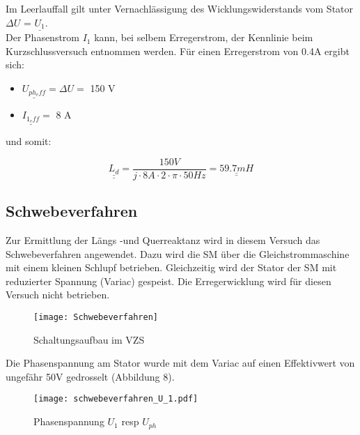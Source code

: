 \begin{flushleft}
\vspace{0.5cm}


Im Leerlauffall gilt unter Vernachlässigung des Wicklungswiderstands vom Stator \\$\Delta U$ = $\underline{U_{1}}$. \\
Der Phasenstrom $I_1$ kann, bei selbem Erregerstrom, der Kennlinie beim Kurzschlussversuch entnommen werden. Für einen Erregerstrom von 0.4A ergibt sich:\\
\vspace{0.3cm}
\begin{itemize}
\item $\underline{U_{ph_eff}} = \Delta U = $ 150 V
\item $\underline{I_{1_eff}} = $ 8 A
\end{itemize}


und somit:

$$\underline{\underline{L_d}} = \frac{150 V }{j \cdot 8 A \cdot 2 \cdot \pi \cdot 50 Hz} = \underline{\underline{59.7 mH}}$$

\newpage



\subsection{Schwebeverfahren}
Zur Ermittlung der Längs -und Querreaktanz wird in diesem Versuch das Schwebeverfahren angewendet. Dazu wird die SM über die Gleichstrommaschine mit einem kleinen Schlupf betrieben. Gleichzeitig wird der Stator der SM mit reduzierter Spannung (Variac) gespeist. Die Erregerwicklung wird für diesen Versuch nicht betrieben.\\
\vspace{0.4cm}


 \begin{figure}[H]
    \centering
        \texttt{[image: Schwebeverfahren]}
    \caption{Schaltungsaufbau im VZS}
    \label{fig:abb1}
\end{figure}


Die Phasenspannung am Stator wurde mit dem Variac auf einen Effektivwert von ungefähr 50V gedrosselt (Abbildung 8). 


\begin{figure}[H]
    \centering
        \texttt{[image: schwebeverfahren\_U\_1.pdf]}
    \caption{Phasenspannung $U_1$ resp $U_{ph}$}
    \label{fig:abb1}
\end{figure}



\end{flushleft}
